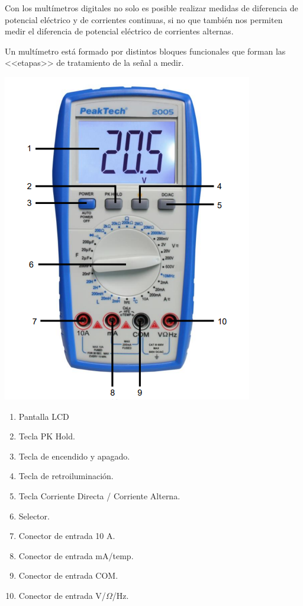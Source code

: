\documentclass[10pt]{article}
\begin{document}
\begin{multicols}{2}
Con los multímetros digitales no solo es posible realizar medidas de diferencia de potencial eléctrico y de corrientes continuas, si no que también nos permiten medir el diferencia de potencial eléctrico de corrientes alternas.

Un multímetro está formado por distintos bloques funcionales que forman las <<etapas>> de tratamiento de la señal a medir.

\begin{center}
	\includegraphics[scale = 0.5]{Imagenes/Marco/Multimetro.PNG}\\
	\begin{enumerate}
		\item Pantalla LCD
		\item Tecla PK Hold.
		\item Tecla de encendido y apagado.
		\item Tecla de retroiluminación.
		\item Tecla Corriente Directa / Corriente Alterna.
		\item Selector.
		\item Conector de entrada 10 A.
		\item Conector de entrada mA/temp.
		\item Conector de entrada COM.
		\item Conector de entrada V/$\Omega$/Hz.
	\end{enumerate}
\end{center}


\end{multicols}
\end{document}
